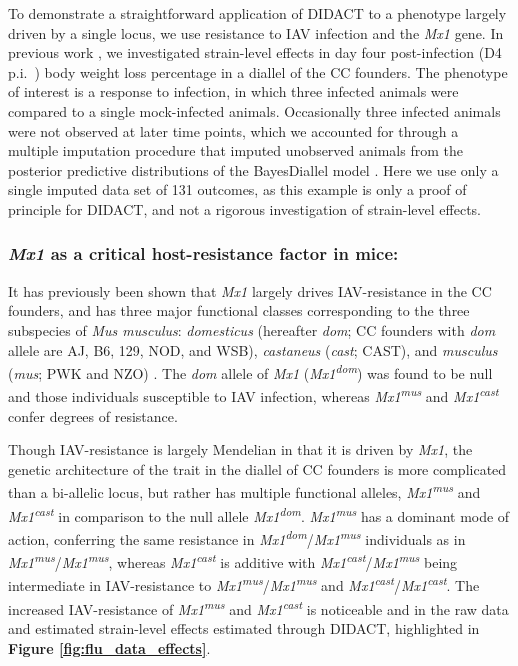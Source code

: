 To demonstrate a straightforward application of DIDACT to a phenotype largely driven by a single locus, we use resistance to IAV infection and the \textit{Mx1} gene. In previous work \citep{Maurizio2017}, we investigated strain-level effects in day four post-infection (D4 p.i.\ ) body weight loss percentage in a diallel of the CC founders. The phenotype of interest is a response to infection, in which three infected animals were compared to a single mock-infected animals. Occasionally three infected animals were not observed at later time points, which we accounted for through a multiple imputation procedure that imputed unobserved animals from the posterior predictive distributions of the BayesDiallel model \citep{Lenarcic2012}. Here we use only a single imputed data set of 131 outcomes, as this example is only a proof of principle for DIDACT, and not a rigorous investigation of strain-level effects. 

\subsubsection{\textit{Mx1} as a critical host-resistance factor in mice:} It has previously been shown that \textit{Mx1} largely drives IAV-resistance in the CC founders, and has three major functional classes corresponding to the three subspecies of \textit{Mus musculus}: \textit{domesticus} (hereafter \textit{dom}; CC founders with \textit{dom} allele are AJ, B6, 129, NOD, and WSB), \textit{castaneus} (\textit{cast}; CAST), and \textit{musculus} (\textit{mus}; PWK and NZO) \citep{Ferris2013}. The \textit{dom} allele of \textit{Mx1} (\textit{Mx1}\textsuperscript{\textit{dom}}) was found to be null and those individuals susceptible to IAV infection, whereas \textit{Mx1}\textsuperscript{\textit{mus}} and \textit{Mx1}\textsuperscript{\textit{cast}} confer degrees of resistance. 

Though IAV-resistance is largely Mendelian in that it is driven by \textit{Mx1}, the genetic architecture of the trait in the diallel of CC founders is more complicated than a bi-allelic locus, but rather has multiple functional alleles, \textit{Mx1}\textsuperscript{\textit{mus}} and \textit{Mx1}\textsuperscript{\textit{cast}} in comparison to the null allele \textit{Mx1}\textsuperscript{\textit{dom}}. \textit{Mx1}\textsuperscript{\textit{mus}} has a dominant mode of action, conferring the same resistance in \textit{Mx1}\textsuperscript{\textit{dom}}/\textit{Mx1}\textsuperscript{\textit{mus}} individuals as in \textit{Mx1}\textsuperscript{\textit{mus}}/\textit{Mx1}\textsuperscript{\textit{mus}}, whereas \textit{Mx1}\textsuperscript{\textit{cast}} is additive with \textit{Mx1}\textsuperscript{\textit{cast}}/\textit{Mx1}\textsuperscript{\textit{mus}} being intermediate in IAV-resistance to \textit{Mx1}\textsuperscript{\textit{mus}}/\textit{Mx1}\textsuperscript{\textit{mus}} and \textit{Mx1}\textsuperscript{\textit{cast}}/\textit{Mx1}\textsuperscript{\textit{cast}}. The increased IAV-resistance of \textit{Mx1}\textsuperscript{\textit{mus}} and \textit{Mx1}\textsuperscript{\textit{cast}} is noticeable and in the raw data and estimated strain-level effects estimated through DIDACT, highlighted in \textbf{Figure \ref{fig:flu_data_effects}}.

